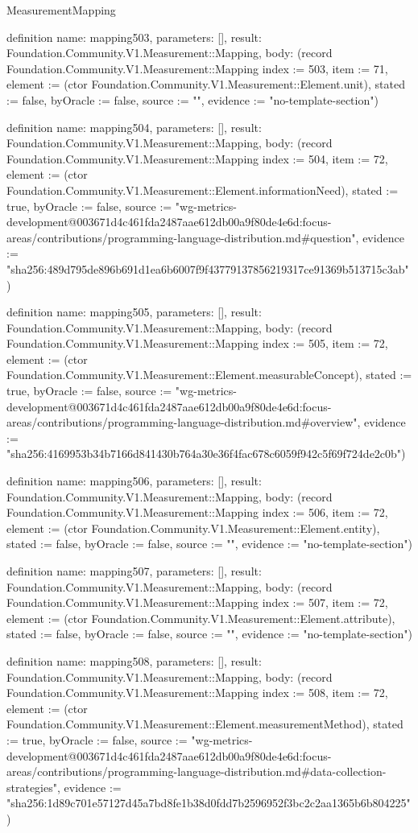 \begin{lexlean}{MeasurementMapping}
\begin{semanticmodule}
definition{
  name: mapping503,
  parameters: [],
  result: Foundation.Community.V1.Measurement::Mapping,
  body: (record Foundation.Community.V1.Measurement::Mapping {index := 503, item := 71, element := (ctor Foundation.Community.V1.Measurement::Element.unit), stated := false, byOracle := false, source := "", evidence := "no-template-section"})
}

definition{
  name: mapping504,
  parameters: [],
  result: Foundation.Community.V1.Measurement::Mapping,
  body: (record Foundation.Community.V1.Measurement::Mapping {index := 504, item := 72, element := (ctor Foundation.Community.V1.Measurement::Element.informationNeed), stated := true, byOracle := false, source := "wg-metrics-development@003671d4c461fda2487aae612db00a9f80de4e6d:focus-areas/contributions/programming-language-distribution.md#question", evidence := "sha256:489d795de896b691d1ea6b6007f9f43779137856219317ce91369b513715c3ab"})
}

definition{
  name: mapping505,
  parameters: [],
  result: Foundation.Community.V1.Measurement::Mapping,
  body: (record Foundation.Community.V1.Measurement::Mapping {index := 505, item := 72, element := (ctor Foundation.Community.V1.Measurement::Element.measurableConcept), stated := true, byOracle := false, source := "wg-metrics-development@003671d4c461fda2487aae612db00a9f80de4e6d:focus-areas/contributions/programming-language-distribution.md#overview", evidence := "sha256:4169953b34b7166d841430b764a30e36f4fac678c6059f942c5f69f724de2c0b"})
}

definition{
  name: mapping506,
  parameters: [],
  result: Foundation.Community.V1.Measurement::Mapping,
  body: (record Foundation.Community.V1.Measurement::Mapping {index := 506, item := 72, element := (ctor Foundation.Community.V1.Measurement::Element.entity), stated := false, byOracle := false, source := "", evidence := "no-template-section"})
}

definition{
  name: mapping507,
  parameters: [],
  result: Foundation.Community.V1.Measurement::Mapping,
  body: (record Foundation.Community.V1.Measurement::Mapping {index := 507, item := 72, element := (ctor Foundation.Community.V1.Measurement::Element.attribute), stated := false, byOracle := false, source := "", evidence := "no-template-section"})
}

definition{
  name: mapping508,
  parameters: [],
  result: Foundation.Community.V1.Measurement::Mapping,
  body: (record Foundation.Community.V1.Measurement::Mapping {index := 508, item := 72, element := (ctor Foundation.Community.V1.Measurement::Element.measurementMethod), stated := true, byOracle := false, source := "wg-metrics-development@003671d4c461fda2487aae612db00a9f80de4e6d:focus-areas/contributions/programming-language-distribution.md#data-collection-strategies", evidence := "sha256:1d89c701e57127d45a7bd8fe1b38d0fdd7b2596952f3bc2c2aa1365b6b804225"})
}


\end{semanticmodule}
\end{lexlean}
